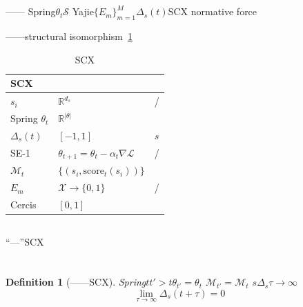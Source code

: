 \documentclass[11pt,a4paper]{article}
\newtheorem{definition}[theorem]{Definition}
\theoremstyle{remark}
\newcommand{\R}{\mathbb{R}}
\newcommand{\X}{\mathcal{X}}
\newcommand{\Sstates}{\mathcal{S}}
\begin{document}
\subsection{}

——\textbf{}
Spring$\theta_t$\textbf{}$\Sstates$\textbf{}
Yajie$\{E_m\}_{m=1}^M$\textbf{}$\Delta_s(t)$SCX
normative force

——\textbf{}structural isomorphism~\ref{tab:mapping}


\begin{table}[htbp]
\centering
\caption{SCX}
\label{tab:mapping}
\begin{tabular}{@{}lll@{}}
\toprule
\textbf{SCX} & \textbf{} & \textbf{} \\
\midrule
 $s_i$ & $\R^{d_s}$ & / \\
Spring $\theta_t$ & $\R^{|\theta|}$ &  \\
 $\Delta_s(t)$ & $[-1, 1]$ & $s$ \\
SE-1 & $\theta_{t+1} = \theta_t - \alpha_t \nabla\mathcal{L}$ & / \\
 $\mathcal{M}_t$ & $\{(s_i, \text{score}_t(s_i))\}$ &  \\
 $E_m$ & $\X \to \{0, 1\}$ & / \\
Cercis & $[0, 1]$ &  \\
\bottomrule
\end{tabular}
\end{table}

\subsection{}

``---''SCX



\section{}

\subsection{}

\begin{definition}[——SCX]
\label{def:economy}
Spring$t$$t' > t$$\theta_{t'} = \theta_t$
$\mathcal{M}_{t'} = \mathcal{M}_t$
$s$$\Delta_s$$\tau \to \infty$
\begin{equation}
    \boxed{
    \lim_{\tau \to \infty} \Delta_s(t + \tau) = 0
    }
\end{equation}
\textbf{}
\end{definition}
\end{document}
